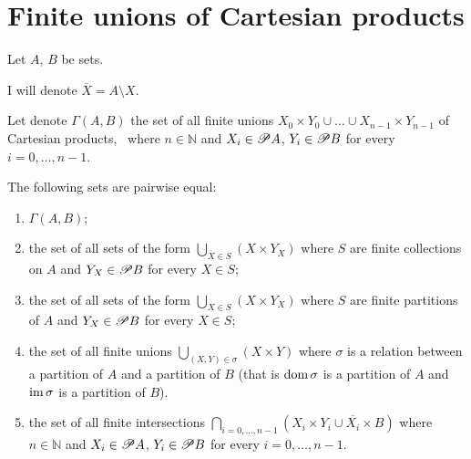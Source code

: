 \section{Finite unions of Cartesian products}

Let $A$, $B$ be sets.

I will denote $\overline{X}=A\setminus X$.

Let denote $\Gamma(A,B)$ the set of all finite unions $X_{0}\times Y_{0}\cup\ldots\cup X_{n-1}\times Y_{n-1}$
of Cartesian products, \ where $n\in\mathbb{N}$ and $X_{i}\in\mathscr{P} A$,
$Y_{i}\in\mathscr{P} B$ for every $i=0,\ldots,n-1$.
\begin{prop}
The following sets are pairwise equal:
\begin{enumerate}
\item \label{gamma-gamma}$\Gamma(A,B)$;
\item \label{gamma-YX}the set of all sets of the form $\bigcup_{X\in S}(X\times Y_{X})$
where $S$ are finite collections on $A$ and $Y_{X}\in\mathscr{P} B$
for every $X\in S$;
\item \label{gamma-YXpart}the set of all sets of the form $\bigcup_{X\in S}(X\times Y_{X})$
where $S$ are finite partitions of $A$ and $Y_{X}\in\mathscr{P} B$
for every $X\in S$;
\item \label{gamma-sigma}the set of all finite unions $\bigcup_{(X,Y)\in\sigma}(X\times Y)$
where $\sigma$ is a relation between a partition of $A$ and a partition
of $B$ (that is $\operatorname{dom}\sigma$ is a partition of $A$ and $\operatorname{im}\sigma$
is a partition of $B$).
\item \label{gamma-lineX}the set of all finite intersections $\bigcap_{i=0,\ldots,n-1}\left(X_{i}\times Y_{i}\cup\overline{X_{i}}\times B\right)$
where $n\in\mathbb{N}$ and $X_{i}\in\mathscr{P} A$, $Y_{i}\in\mathscr{P} B$
for every $i=0,\ldots,n-1$.
\end{enumerate}
\end{prop}
